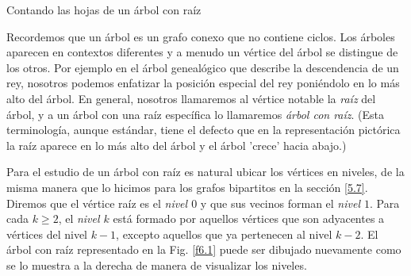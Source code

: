 \begin{section}{Contando las hojas de un árbol con raíz}
\label{6.1}

Recordemos que un {árbol} es un grafo conexo que no contiene ciclos. Los árboles aparecen en contextos diferentes y a menudo un vértice del árbol se distingue de los otros. Por ejemplo en el árbol genealógico que describe la descendencia de un rey, nosotros podemos enfatizar la posición especial del rey poniéndolo en lo
más alto del árbol. En general, nosotros llamaremos al vértice notable la \textit{raíz} del árbol, y a un árbol con una raíz  específica lo llamaremos \textit{árbol con raíz}. (Esta  terminología, aunque estándar, tiene el defecto que en la representación pictórica la raíz aparece en lo
más alto del árbol y el árbol 'crece' hacia abajo.)

Para el estudio de un árbol con raíz es natural ubicar los vértices en niveles, de la misma manera que lo hicimos para los grafos bipartitos en la sección \ref{5.7}. Diremos que el vértice raíz es el \textit{nivel $0$} y que sus vecinos forman el \textit{nivel $1$}.  Para cada $k\ge 2$, el \textit{nivel $k$} está formado por aquellos vértices que son adyacentes a vértices del nivel $k-1$, excepto aquellos que ya pertenecen al nivel $k-2$. El árbol con raíz representado en la Fig. \ref{f6.1} puede ser dibujado nuevamente como se lo muestra a la derecha de manera de visualizar los niveles. 


\end{section}
